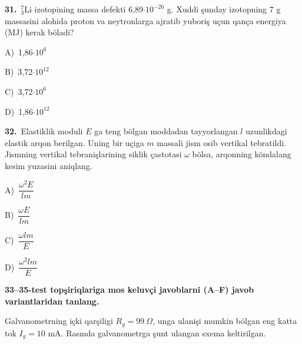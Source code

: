 \documentclass[11pt,a4paper]{article}
\newcommand{\opt}[2]{\hspace*{4mm}#1)\ #2\par}
\begin{document}
\noindent\begin{minipage}{\linewidth}
\textbf{31.}\ $^7_3$Li izotopining massa defekti 6,89$\cdot10^{-26}$ g. Xuddi şunday izotopning 7 g massasini alohida proton va neytronlarga ajratib yuboriş uçun qança energiya (MJ) kerak böladi?\par\smallskip
\opt{A}{1,86$\cdot10^{6}$}
\opt{B}{3,72$\cdot10^{12}$}
\opt{C}{3,72$\cdot10^{6}$}
\opt{D}{1,86$\cdot10^{12}$}
\end{minipage}\vspace{9pt}\par
\noindent\begin{minipage}{\linewidth}
\textbf{32.}\ Elastiklik moduli $E$ ga teng bölgan moddadan tayyorlangan $l$ uzunlikdagi elastik arqon berilgan. Uning bir uçiga $m$ massali jism osib vertikal tebratildi. Jismning vertikal tebranişlarining siklik çastotasi $\omega$ bölsa, arqonning köndalang kesim yuzasini aniqlang.\par\smallskip
\opt{A}{$\dfrac{\omega^2E}{lm}$}
\opt{B}{$\dfrac{\omega E}{lm}$}
\opt{C}{$\dfrac{\omega lm}{E}$}
\opt{D}{$\dfrac{\omega^2lm}{E}$}
\end{minipage}\vspace{9pt}\par
\newpage\noindent\textbf{33–35-test topşiriqlariga mos keluvçi javoblarni (A–F) javob variantlaridan tanlang.}\par\smallskip
Galvanometrning içki qarşiligi $R_g=99\ \Omega$, unga ulanişi mumkin bölgan eng katta tok $I_g=10$ mA. Rasmda galvanometrga şunt ulangan sxema keltirilgan.\par\medskip
\begin{center}\end{center}
\end{document}
